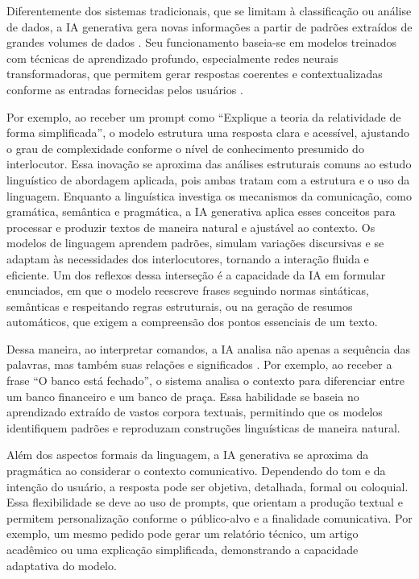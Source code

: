 \documentclass[portuguese]{textolivre}
\begin{document}
Diferentemente dos sistemas tradicionais, que se limitam à classificação ou análise de dados, a IA generativa gera novas informações a partir de padrões extraídos de grandes volumes de dados \cite{holmes2024guia}. Seu funcionamento baseia-se em modelos treinados com técnicas de aprendizado profundo, especialmente redes neurais transformadoras, que permitem gerar respostas coerentes e contextualizadas conforme as entradas fornecidas pelos usuários \cite{holmes2024guia}. 

Por exemplo, ao receber um prompt como “Explique a teoria da relatividade de forma simplificada”, o modelo estrutura uma resposta clara e acessível, ajustando o grau de complexidade conforme o nível de conhecimento presumido do interlocutor.
Essa inovação se aproxima das análises estruturais comuns ao estudo linguístico de abordagem aplicada, pois ambas tratam com a estrutura e o uso da linguagem. Enquanto a linguística investiga os mecanismos da comunicação, como gramática, semântica e pragmática, a IA generativa aplica esses conceitos para processar e produzir textos de maneira natural e ajustável ao contexto. Os modelos de linguagem aprendem padrões, simulam variações discursivas e se adaptam às necessidades dos interlocutores, tornando a interação fluida e eficiente. Um dos reflexos dessa interseção é a capacidade da IA em formular enunciados, em que o modelo reescreve frases seguindo normas sintáticas, semânticas e respeitando regras estruturais, ou na geração de resumos automáticos, que exigem a compreensão dos pontos essenciais de um texto.

Dessa maneira, ao interpretar comandos, a IA analisa não apenas a sequência das palavras, mas também suas relações e significados \cite{holmes2024guia}. Por exemplo, ao receber a frase “O banco está fechado”, o sistema analisa o contexto para diferenciar entre um banco financeiro e um banco de praça. Essa habilidade se baseia no aprendizado extraído de vastos corpora textuais, permitindo que os modelos identifiquem padrões e reproduzam construções linguísticas de maneira natural.

Além dos aspectos formais da linguagem, a IA generativa se aproxima da pragmática ao considerar o contexto comunicativo. Dependendo do tom e da intenção do usuário, a resposta pode ser objetiva, detalhada, formal ou coloquial. Essa flexibilidade se deve ao uso de prompts, que orientam a produção textual e permitem personalização conforme o público-alvo e a finalidade comunicativa. Por exemplo, um mesmo pedido pode gerar um relatório técnico, um artigo acadêmico ou uma explicação simplificada, demonstrando a capacidade adaptativa do modelo.
\end{document}
